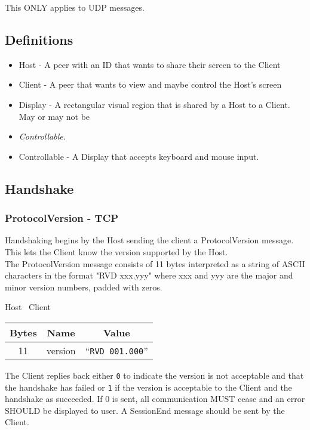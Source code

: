This ONLY applies to UDP messages.

\subsection{Definitions}

\begin{itemize}
    \item Host - A peer with an ID that wants to share their screen to the Client
    \item Client - A peer that wants to view and maybe control the Host's screen
    \item Display - A rectangular visual region that is shared by a Host to a Client. May or may not be
    \item \emph{Controllable}.
    \item Controllable - A Display that accepts keyboard and mouse input.
\end{itemize}

\subsection{Handshake}

\subsubsection{ProtocolVersion - TCP}
Handshaking begins by the Host sending the client a ProtocolVersion message. This lets the Client know the
version supported by the Host.\\

The ProtocolVersion message consists of 11 bytes interpreted as a string of ASCII characters in the format
"RVD xxx.yyy" where xxx and yyy are the major and minor version numbers, padded with zeros.

\begin{center}
    Host \textrightarrow\ Client\\
    \begin{tabular}{|c|c|c|}
        \hline
        \textbf{Bytes} & \textbf{Name} & \textbf{Value}           \\
        \hline
        11             & version       & ``\texttt{RVD 001.000}'' \\
        \hline
    \end{tabular}
\end{center}

The Client replies back either \texttt{0} to indicate the version is not acceptable and that the handshake has
failed or \texttt{1} if the version is acceptable to the Client and the handshake as succeeded. If 0 is sent, all
communication MUST cease and an error SHOULD be displayed to user. A SessionEnd message should be sent by
the Client.


